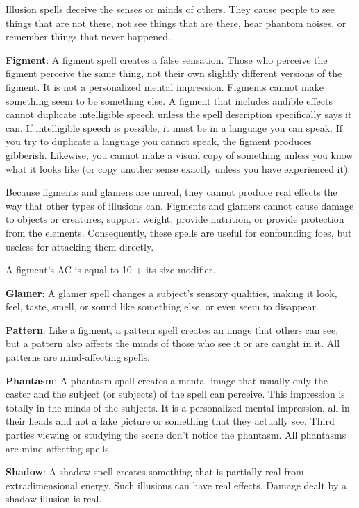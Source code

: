 				
Illusion spells deceive the senses or minds of others. They cause people to see things that are not there, not see things that are there, hear phantom noises, or remember things that never happened.
				
\textbf{Figment}: A figment spell creates a false sensation. Those who perceive the figment perceive the same thing, not their own slightly different versions of the figment. It is not a personalized mental impression. Figments cannot make something seem to be something else. A figment that includes audible effects cannot duplicate intelligible speech unless the spell description specifically says it can. If intelligible speech is possible, it must be in a language you can speak. If you try to duplicate a language you cannot speak, the figment produces gibberish. Likewise, you cannot make a visual copy of something unless you know what it looks like (or copy another sense exactly unless you have experienced it).
				
Because figments and glamers are unreal, they cannot produce real effects the way that other types of illusions can. Figments and glamers cannot cause damage to objects or creatures, support weight, provide nutrition, or provide protection from the elements. Consequently, these spells are useful for confounding foes, but useless for attacking them directly. 
				
A figment's AC is equal to 10 + its size modifier.
				
\textbf{Glamer}: A glamer spell changes a subject's sensory qualities, making it look, feel, taste, smell, or sound like something else, or even seem to disappear.
				
\textbf{Pattern}: Like a figment, a pattern spell creates an image that others can see, but a pattern also affects the minds of those who see it or are caught in it. All patterns are mind-affecting spells.
				
\textbf{Phantasm}: A phantasm spell creates a mental image that usually only the caster and the subject (or subjects) of the spell can perceive. This impression is totally in the minds of the subjects. It is a personalized mental impression, all in their heads and not a fake picture or something that they actually see. Third parties viewing or studying the scene don't notice the phantasm. All phantasms are mind-affecting spells.
				
\textbf{Shadow}: A shadow spell creates something that is partially real from extradimensional energy. Such illusions can have real effects. Damage dealt by a shadow illusion is real.
				
